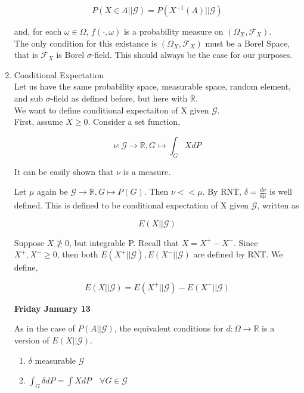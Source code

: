 \documentclass[11pt,fleqn]{book} %
\begin{document}
\begin{enumerate}
			$$P(X \in A || \mathcal{G}) = P(X^{-1}(A) || \mathcal{G}) $$

	and, for each $\omega \in \Omega$,  $f(\cdot, \omega)$ is a probability measure on $(\Omega_X, \mathcal{F}_X)$. \\

	The only condition for this existance is $(\Omega_X, \mathcal{F}_X)$ must be a Borel Space, that is $\mathcal{F}_X$ is Borel $\sigma$-field. This should always be the case for our purposes. 
	

	\item Conditional Expectation\\

	Let us have the same probability space, measurable space, random element, and sub $\sigma$-field as defined before, but here with $\bar{\mathbb{R}}$.  \\

	We want to define conditional expectaiton of X given $\mathcal{G}$. \\

	First, assume $X \geq 0$. Consider a set function, 

			$$\nu: \mathcal{G} \rightarrow \mathbb{R}, G \mapsto \int_G X dP $$ 

	It can be easily shown that $\nu$ is a measure. 

	Let $\mu$ again be $\mathcal{G} \rightarrow \mathbb{R}, G \mapsto  P(G)$. Then $\nu << \mu$. By RNT, $\delta = \frac{d\nu}{d\mu}$ is well defined. This is defined to be conditional expectation of X given $\mathcal{G}$, written as 

			$$E(X|| \mathcal{G}) $$

	Suppose $X \ngeq 0$, but integrable P. Recall that $X = X^+ - X^-$. Since $X^+, X^- \geq 0$, then both $E(X^+|| \mathcal{G}), E(X^-|| \mathcal{G})$ are defined by RNT. We define, 

			$$E(X|| \mathcal{G}) = E(X^+|| \mathcal{G}) - E(X^-|| \mathcal{G}) $$

				 

\textbf{Friday January 13}

	As in the case of $P(A || \mathcal{G})$, the equivalent conditions for $d: \Omega \rightarrow \mathbb{R} $ is a version of $E(X||\mathcal{G})$. 

			\begin{enumerate}
				\item $\delta$ measurable $\mathcal{G}$
				\item $\int_G \delta dP = \int X dP \quad \forall G \in \mathcal{G}$ 
			\end{enumerate}


\end{enumerate}
\end{document}

